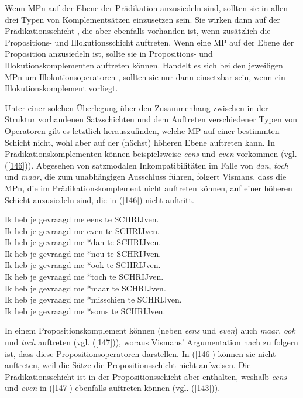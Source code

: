 Wenn MPn auf der Ebene der Prädikation anzusiedeln sind, sollten sie in allen drei Typen von Komplementsätzen einzusetzen sein. Sie wirken dann auf der Prädikationsschicht , die aber ebenfalls vorhanden ist, wenn zusätzlich die Proposi\-tions- und Illokutionsschicht auftreten. Wenn eine MP auf der Ebene der Proposition anzusiedeln ist, sollte sie in Propositions- und Illokutionskomplementen  auftreten können. Handelt es sich bei den jeweiligen MPn um Illokutionsope\-ratoren , sollten sie nur dann einsetzbar sein, wenn ein Illokutionskomplement vorliegt.

Unter einer solchen Überlegung über den Zusammenhang zwischen in der Struktur vorhandenen Satzschichten und dem Auftreten verschiedener Typen von Operatoren gilt es letztlich herauszufinden, welche MP auf einer bestimmten Schicht nicht, wohl aber auf der (nächst) höhe\-ren Ebene auftreten kann. In Prädikationskomplementen  können beispielsweise \textit{eens} und \textit{even} vorkommen (vgl. (\ref{146})). Abgesehen von satzmodalen Inkompatibilitäten im Falle von \textit{dan}, \textit{toch} und \textit{maar}, die zum unabhängigen Ausschluss führen, folgert Vismans, dass die MPn, die im Prädikationskomplement  nicht auftreten können, auf einer höhe\-ren Schicht anzusiedeln sind, die in (\ref{146}) nicht auftritt.

\begin{exe}
	\ex\label{146} 
	Ik heb je gevraagd me eens te SCHRIJven.\\
	Ik heb je gevraagd me even te SCHRIJven.\\
	Ik heb je gevraagd me *dan te SCHRIJven.\\
	Ik heb je gevraagd me *nou te SCHRIJven.\\
	Ik heb je gevraagd me *ook te SCHRIJven.\\
	Ik heb je gevraagd me *toch te SCHRIJven.\\
	Ik heb je gevraagd me *maar te SCHRIJven.\\
	Ik heb je gevraagd me *misschien te SCHRIJven.\\
	Ik heb je gevraagd me *soms te SCHRIJven.
	\hfill\hbox {\citet[157]{Vismans1994}}
\end{exe}
In einem Propositionskomplement  können (neben \textit{eens} und \textit{even}) auch \textit{maar}, \textit{ook} und \textit{toch} auftreten (vgl. (\ref{147})), woraus Vismans' Argumentation nach zu folgern ist, dass diese Propositionsoperatoren  darstellen. In (\ref{146}) können sie nicht auftreten, weil die Sätze die Propositionsschicht nicht aufweisen. Die Prädikationsschicht ist in der Propositionsschicht aber enthalten, weshalb \textit{eens} und \textit{even} in (\ref{147}) ebenfalls auftreten können (vgl. (\ref{143})).

